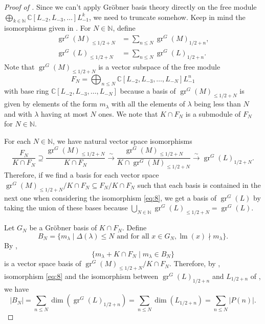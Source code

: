 \documentclass[a4paper, 12pt, reqno]{amsart}
\theoremstyle{remark}
\DeclareMathOperator{\gr}{gr}
\DeclareMathOperator{\lm}{lm}
\begin{document}
\begin{proof}[Proof of ]
  Since we can't apply Gr\"{o}bner basis theory directly on the free module $\bigoplus_{k \in \mathbb{N}}\mathbb{C}[L_{-2}, L_{-3}, \dots]L_{-1}^k$, we need to truncate somehow.
  Keep in mind the isomorphisms given in .
  For $N \in \mathbb{N}$, define
  \begin{align*}
    \gr^G(M)_{\le 1/2 + N} &= \sum_{n \le N}\gr^G(M)_{1/2 + n}, \\
    \gr^G(L)_{\le 1/2 + N} &= \sum_{n \le N}\gr^G(L)_{1/2 + n}.
  \end{align*}
  Note that $\gr^G(M)_{\le 1/2 + N}$ is a vector subspace of the free module
  \begin{equation*}
    F_N = \bigoplus_{n \le N}\mathbb{C}[L_{-2}, L_{-3}, \dots, L_{-N}]L_{-1}^n
  \end{equation*}
  with base ring $\mathbb{C}[L_{-2}, L_{-3}, \dots, L_{-N}]$ because a basis of $\gr^G(M)_{\le 1/2 + N}$ is given by elements of the form $m_\lambda$ with all the elements of $\lambda$ being less than $N$ and with $\lambda$ having at most $N$ ones.
  We note that $K \cap F_N$ is a submodule of $F_N$ for $N \in \mathbb{N}$.
  
  For each $N \in \mathbb{N}$, we have natural vector space isomorphisms
  \begin{equation}
    \label{eq:8}
    \frac{F_N}{K \cap F_N} \supseteq \frac{\gr^G(M)_{\le 1/2 + N}}{K \cap F_N} \xrightarrow{\sim} \frac{\gr^G(M)_{\le 1/2 + N}}{K \cap \gr^G(M)_{\le 1/2 + N}} \xrightarrow{\sim} \gr^G(L)_{1/2 + N}.
  \end{equation}
  Therefore, if we find a basis for each vector space $\gr^G(M)_{\le 1/2 + N}/K \cap F_N \subseteq F_N/K \cap F_N$ such that each basis is contained in the next one when considering the isomorphism \eqref{eq:8}, we get a basis of $\gr^G(L)$ by taking the union of these bases because $\bigcup_{N \in \mathbb{N}}\gr^G(L)_{\le 1/2 + N} = \gr^G(L)$.
  
  Let $G_N$ be a Gr\"{o}bner basis of $K \cap F_N$.
  Define
  \begin{equation*}
    B_N = \{m_\lambda \mid \Delta(\lambda) \le N\text{ and for all }x \in G_N, \lm(x) \nmid m_\lambda\}.
  \end{equation*}
  By \cite[Proposition 3.6.4]{adams_introduction_1994},
  \begin{equation}
    \label{eq:9}
    \{m_\lambda + K \cap F_N \mid m_\lambda \in B_N\}
  \end{equation}
  is a vector space basis of $\gr^G(M)_{\le 1/2 + N}/K \cap F_N$.
  Therefore, by , isomorphism \eqref{eq:8} and the isomorphism between $\gr^G(L)_{1/2 + n}$ and $L_{1/2 + n}$ of , we have
  \begin{equation*}
    |B_N| = \sum_{n \le N}\dim(\gr^G(L)_{1/2 + n}) = \sum_{n \le N}\dim(L_{1/2 + n}) = \sum_{n \le N}|P(n)|.
  \end{equation*}
  

\end{proof}
\end{document}
